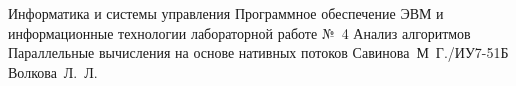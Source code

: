 \documentclass{bmstu}[a4paper]
\begin{document}
	
	\makereporttitle
	{Информатика и системы управления} %
	{Программное обеспечение ЭВМ и информационные технологии} %
	{лабораторной работе №~4} %
	{Анализ алгоритмов} %
	{Параллельные вычисления на основе нативных потоков} %
	{} %
	{Савинова~М~Г./ИУ7-51Б} %
	{Волкова~Л.~Л.} %
	
	\maketableofcontents
	
	
	
	
	
	
	
	
	
	\makebibliography
	
	
	
	
\end{document}
